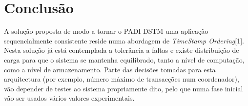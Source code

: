 \section{Conclusão}

A solução proposta de modo a tornar o PADI-DSTM uma aplicação sequencialmente consistente reside numa abordagem de \textit{TimeStamp Ordering}[1].  Nesta solução já está contemplada a tolerância a faltas e existe distribuição de carga para que o sistema se mantenha equilibrado, tanto a nível de computação, como a nível de armazenamento. Parte das decisões tomadas para esta arquitectura (por exemplo, número máximo de transacções num coordenador), vão depender de testes ao sistema propriamente dito, pelo que numa fase inicial vão ser usados vários valores experimentais.